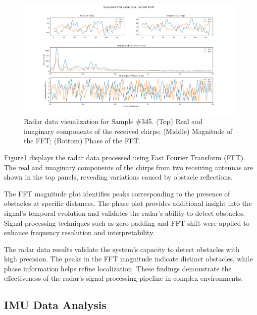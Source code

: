 \documentclass[12pt,a4paper]{article}
\begin{document}
\begin{figure}[h!]
    \centering
    \includegraphics[width=\textwidth]{Radar_sample_345.png}
    \caption{Radar data visualization for Sample \#345. (Top) Real and imaginary components of the received chirps; (Middle) Magnitude of the FFT; (Bottom) Phase of the FFT.}
    \label{fig:Radar}
\end{figure}

Figure\ref{fig:Radar} displays the radar data processed using Fast Fourier Transform (FFT). The real and imaginary components of the chirps from two receiving antennas are shown in the top panels, revealing variations caused by obstacle reflections. 

The FFT magnitude plot identifies peaks corresponding to the presence of obstacles at specific distances. The phase plot provides additional insight into the signal's temporal evolution and validates the radar's ability to detect obstacles. Signal processing techniques such as zero-padding and FFT shift were applied to enhance frequency resolution and interpretability.

The radar data results validate the system's capacity to detect obstacles with high precision. The peaks in the FFT magnitude indicate distinct obstacles, while phase information helps refine localization. These findings demonstrate the effectiveness of the radar's signal processing pipeline in complex environments.

\subsection{IMU Data Analysis}
\end{document}
